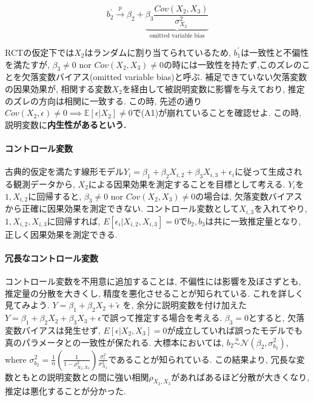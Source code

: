 \documentclass[paper=a4paper,fontsize=10pt]{jlreq}
\begin{document}
\begin{equation*}
  b_2^\prime \overset{p}{\to} \beta_2+ \underset{\text{omitted variable bias}}{\underbrace{\beta_3\frac{Cov(X_2, X_3)}{\sigma_{X_2}^2}}}
\end{equation*}

RCTの仮定下では$X_2$はランダムに割り当てられているため, $b_1^\prime$は一致性と不偏性を満たすが, $\beta_3 \neq 0 \text{ nor } Cov(X_2, X_{3})\neq 0$の時には一致性を持たず,このズレのことを欠落変数バイアス(omitted variable bias)と呼ぶ. 補足できていない欠落変数の因果効果が, 相関する変数$X_2$を経由して被説明変数に影響を与えており, 推定のズレの方向は相関に一致する. この時, 先述の通り$ Cov(X_2, \epsilon) \neq 0 \implies \mathbb{E}[\epsilon | X_{2}] \neq 0$で(A1)が崩れていることを確認せよ. この時, 説明変数に\rmfamily\mcfamily\bfseries{内生性}\mdseries があるという.\\

\paragraph{コントロール変数}
古典的仮定を満たす線形モデル$Y_i=\beta_1+\beta_2X_{i,2}+\beta_3X_{i,3}+\epsilon_i$に従って生成される観測データから, $X_2$による因果効果を測定することを目標として考える. $Y_i$を$1, X_{i,2}$に回帰すると, $\beta_3 \neq 0 \text{ nor } Cov(X_2, X_{3})\neq 0$の場合は, 欠落変数バイアスから正確に因果効果を測定できない. コントロール変数として$X_{i,3}$を入れてやり, $1, X_{i,2}, X_{i,3}$に回帰すれば, $E[\epsilon_i | X_{i,2}, X_{i,3}]=0$で$b_2, b_3$は共に一致推定量となり, 正しく因果効果を測定できる.\\

\paragraph{冗長なコントロール変数}
コントロール変数を不用意に追加することは, 不偏性には影響を及ぼさずとも, 推定量の分散を大きくし, 精度を悪化させることが知られている. これを詳しく見てみよう. $Y=\beta_1+\beta_2X_{2}+\tilde{\epsilon}$ を, 余分に説明変数を付け加えた$Y=\beta_1+\beta_2X_{2}+\beta_3X_{3}+\epsilon$で誤って推定する場合を考える. $\beta_3=0$とすると, 欠落変数バイアスは発生せず, ${E}[\epsilon | X_{2}, X_{3}]=0$が成立していれば誤ったモデルでも真のパラメータとの一致性が保たれる. 大標本においては, $b_2 \overset{a}{\sim} \mathcal{N}(\beta_2, \sigma_{b_2}^2)$, where $\sigma_{b_2}^2=\frac{1}{n}(\frac{1}{1-\rho_{X_{2}, X_{3}}^2})\frac{\sigma_\epsilon^2}{\sigma_{X_{2}}^2}$であることが知られている. この結果より, 冗長な変数ともとの説明変数との間に強い相関$\rho_{X_{2}, X_{3}}$があればあるほど分散が大きくなり, 推定は悪化することが分かった.\\
\end{document}
